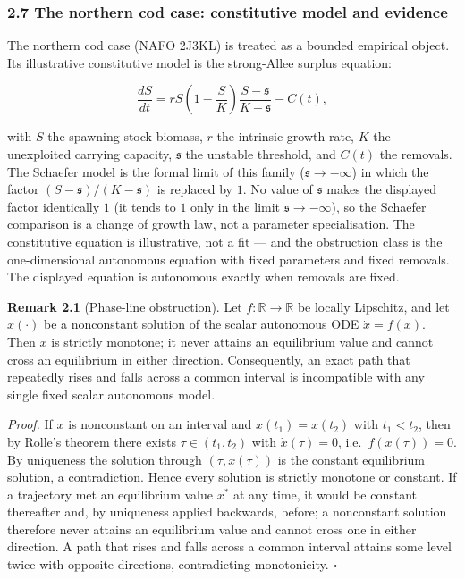\documentclass[11pt]{article}
\begin{document}
\subsubsection{2.7 The northern cod case: constitutive model and
evidence}\label{the-northern-cod-case-constitutive-model-and-evidence}

The northern cod case (NAFO 2J3KL) is treated as a bounded empirical
object. Its illustrative constitutive model is the strong-Allee surplus
equation:

\[
\frac{dS}{dt}=rS\left(1-\frac{S}{K}\right)\frac{S-\mathfrak s}{K-\mathfrak s}-C(t),
\tag{5}
\]

with \(S\) the spawning stock biomass, \(r\) the intrinsic growth rate,
\(K\) the unexploited carrying capacity, \(\mathfrak s\) the unstable
threshold, and \(C(t)\) the removals. The Schaefer model is the
formal limit of this family (\(\mathfrak s\to-\infty\)) in which the factor
\((S-\mathfrak s)/(K-\mathfrak s)\) is replaced by \(1\). No value of
\(\mathfrak s\) makes the displayed factor identically \(1\) (it tends
to \(1\) only in the limit \(\mathfrak s\to-\infty\)), so the Schaefer
comparison is a change of growth law, not a parameter specialisation.
The constitutive equation is illustrative, not a fit --- and the obstruction class is the
one-dimensional autonomous equation with fixed parameters and fixed
removals. The displayed equation is autonomous exactly when removals are
fixed.

\textbf{Remark 2.1} (Phase-line obstruction). Let
\(f:\mathbb{R}\to\mathbb{R}\) be locally Lipschitz, and let \(x(\cdot)\)
be a nonconstant solution of the scalar autonomous ODE \(\dot x=f(x)\).
Then \(x\) is strictly monotone; it never attains an equilibrium value
and cannot cross an equilibrium in either direction. Consequently, an
exact path that repeatedly rises and falls across a common interval is
incompatible with any single fixed scalar autonomous model.

\emph{Proof.} If \(x\) is nonconstant on an interval and
\(x(t_1)=x(t_2)\) with \(t_1<t_2\), then by Rolle's theorem there exists
\(\tau\in(t_1,t_2)\) with \(\dot x(\tau)=0\), i.e.~\(f(x(\tau))=0\). By
uniqueness the solution through \((\tau,x(\tau))\) is the constant
equilibrium solution, a contradiction. Hence every solution is strictly
monotone or constant. If a trajectory met an equilibrium value \(x^*\)
at any time, it would be constant thereafter and, by uniqueness applied
backwards, before; a nonconstant solution therefore never attains an
equilibrium value and cannot cross one in either direction. A path that
rises and falls across a common interval attains some level twice with
opposite directions, contradicting monotonicity. \ensuremath{\square}
\end{document}
